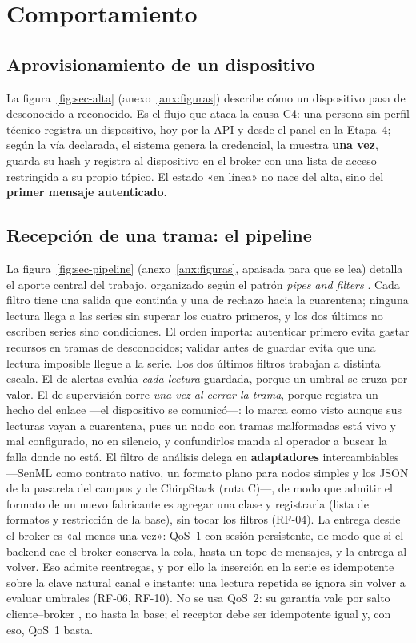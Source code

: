 \section{Comportamiento}

\subsection{Aprovisionamiento de un dispositivo}

La figura~\ref{fig:sec-alta} (anexo~\ref{anx:figuras}) describe cómo un dispositivo pasa de desconocido a reconocido. Es el flujo que ataca la causa C4: una persona sin perfil técnico registra un dispositivo, hoy por la API y desde el panel en la Etapa~4; según la vía declarada, el sistema genera la credencial, la muestra \textbf{una vez}, guarda su hash y registra
al dispositivo en el broker con una lista de acceso restringida a su propio tópico. El estado «en línea»
no nace del alta, sino del \textbf{primer mensaje autenticado}.


\subsection{Recepción de una trama: el pipeline}

La figura~\ref{fig:sec-pipeline} (anexo~\ref{anx:figuras}, apaisada para que se lea) detalla el aporte central del trabajo, organizado según el patrón
\emph{pipes and filters} \parencite{posa1}. Cada filtro tiene una salida que
continúa y una de rechazo hacia la cuarentena; ninguna lectura llega a las series sin superar los cuatro
primeros, y los dos últimos no escriben series sino condiciones.
El orden importa: autenticar primero evita gastar recursos en tramas de desconocidos; validar antes de
guardar evita que una lectura imposible llegue a la serie. Los dos últimos filtros trabajan a distinta escala. El de alertas evalúa \emph{cada lectura} guardada, porque un umbral se cruza por valor. El de supervisión corre \emph{una vez al cerrar la trama}, porque registra un hecho del enlace —el dispositivo se comunicó—: lo marca como visto aunque sus lecturas vayan a cuarentena, pues un nodo con tramas malformadas está vivo y mal configurado, no en silencio, y confundirlos manda al operador a buscar la falla donde no está. El filtro de análisis delega en \textbf{adaptadores} intercambiables —SenML \parencite{rfc8428} como contrato nativo, un formato plano para nodos simples y los JSON de la pasarela del campus y de ChirpStack (ruta C)—, de modo que admitir el formato de un nuevo
fabricante es agregar una clase y registrarla (lista de formatos y restricción de la base), sin tocar los filtros (RF-04). La entrega desde el broker es
«al menos una vez»: QoS~1 con sesión persistente, de modo que si el backend cae el broker conserva la
cola, hasta un tope de mensajes, y la entrega al volver. Eso admite reentregas, y por ello la inserción en la serie es idempotente
sobre la clave natural canal e instante: una lectura repetida se ignora sin volver a evaluar umbrales
(RF-06, RF-10). No se usa QoS~2: su garantía vale por salto cliente–broker \parencite{mqttoasis}, no
hasta la base; el receptor debe ser idempotente igual y, con eso, QoS~1 basta.


